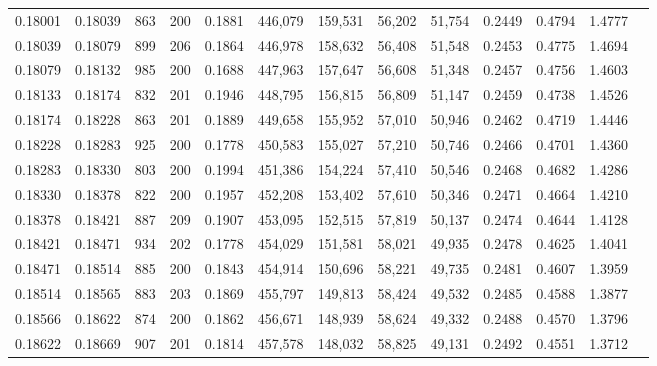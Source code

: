 \begin{tabular}{rrrrrrrrrrrrr}
0.18001 & 0.18039 &   863 & 200 &                                     0.1881 & 446,079 & 159,531 &  56,202 &  51,754 & 0.2449 & 0.4794 & 1.4777 \\
0.18039 & 0.18079 &   899 & 206 &                                     0.1864 & 446,978 & 158,632 &  56,408 &  51,548 & 0.2453 & 0.4775 & 1.4694 \\
0.18079 & 0.18132 &   985 & 200 &                                     0.1688 & 447,963 & 157,647 &  56,608 &  51,348 & 0.2457 & 0.4756 & 1.4603 \\
0.18133 & 0.18174 &   832 & 201 &                                     0.1946 & 448,795 & 156,815 &  56,809 &  51,147 & 0.2459 & 0.4738 & 1.4526 \\
0.18174 & 0.18228 &   863 & 201 &                                     0.1889 & 449,658 & 155,952 &  57,010 &  50,946 & 0.2462 & 0.4719 & 1.4446 \\
0.18228 & 0.18283 &   925 & 200 &                                     0.1778 & 450,583 & 155,027 &  57,210 &  50,746 & 0.2466 & 0.4701 & 1.4360 \\
0.18283 & 0.18330 &   803 & 200 &                                     0.1994 & 451,386 & 154,224 &  57,410 &  50,546 & 0.2468 & 0.4682 & 1.4286 \\
0.18330 & 0.18378 &   822 & 200 &                                     0.1957 & 452,208 & 153,402 &  57,610 &  50,346 & 0.2471 & 0.4664 & 1.4210 \\
0.18378 & 0.18421 &   887 & 209 &                                     0.1907 & 453,095 & 152,515 &  57,819 &  50,137 & 0.2474 & 0.4644 & 1.4128 \\
0.18421 & 0.18471 &   934 & 202 &                                     0.1778 & 454,029 & 151,581 &  58,021 &  49,935 & 0.2478 & 0.4625 & 1.4041 \\
0.18471 & 0.18514 &   885 & 200 &                                     0.1843 & 454,914 & 150,696 &  58,221 &  49,735 & 0.2481 & 0.4607 & 1.3959 \\
0.18514 & 0.18565 &   883 & 203 &                                     0.1869 & 455,797 & 149,813 &  58,424 &  49,532 & 0.2485 & 0.4588 & 1.3877 \\
0.18566 & 0.18622 &   874 & 200 &                                     0.1862 & 456,671 & 148,939 &  58,624 &  49,332 & 0.2488 & 0.4570 & 1.3796 \\
0.18622 & 0.18669 &   907 & 201 &                                     0.1814 & 457,578 & 148,032 &  58,825 &  49,131 & 0.2492 & 0.4551 & 1.3712 \\

\end{tabular}
